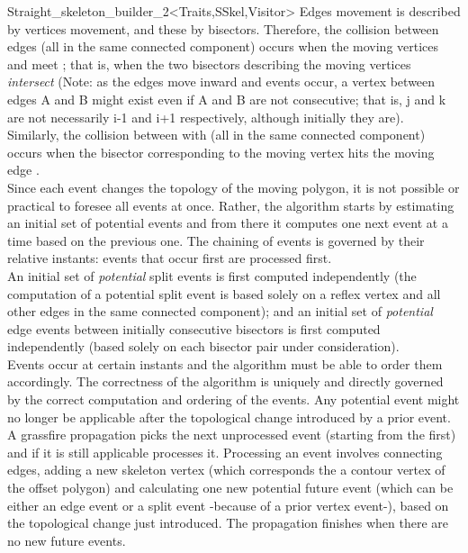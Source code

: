 \begin{ccRefClass}{Straight_skeleton_builder_2<Traits,SSkel,Visitor>}
Edges movement is described by vertices movement, and these by bisectors. Therefore, the collision between edges  (all in the same connected component) occurs when the moving vertices  and  meet ; that is, when the two bisectors describing the moving vertices 
{\em intersect} (Note: as the edges move inward and events occur, a vertex between edges A and B might exist even if A and B are not consecutive; that is, j and k are not necessarily i-1 and i+1 respectively, although initially they are).\\
Similarly, the collision between  with  (all in the same connected component) occurs when the bisector corresponding to the moving vertex  hits the moving edge .\\
Since each event changes the topology of the moving polygon, it is not possible or practical to foresee all events at once. Rather, the algorithm starts by estimating an initial set of potential events and from there it computes one next event at a time based on the previous one. The chaining of events is governed by their relative instants: events that occur first are processed first.\\
An initial set of \textit{potential} split events is first computed independently (the computation of a potential split event is based solely on a reflex vertex and all other edges in the same connected component); and an initial set of \textit{potential} edge events between initially consecutive bisectors is first computed independently (based solely on each bisector pair under consideration).\\
Events occur at certain instants and the algorithm must be able to order them
accordingly. The correctness of the algorithm is uniquely and directly governed by the correct computation and ordering of the events. Any potential event might no longer be applicable after the topological change introduced by a prior event.\\
A grassfire propagation picks the next unprocessed event (starting from the first) and if it is still applicable processes it. Processing an event involves connecting edges, adding a new skeleton vertex (which corresponds the a contour vertex of the offset polygon) and calculating one new potential future event (which can be either an edge event or a split event -because of a prior vertex event-), based on the topological change just introduced. The propagation finishes when there are no new future events.


\end{ccRefClass}
